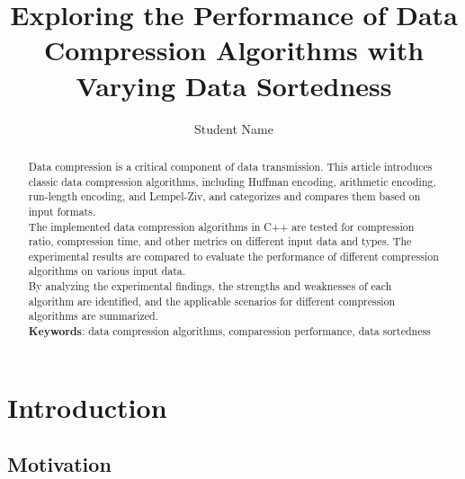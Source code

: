 \documentclass[sigconf]{acmart}
\begin{document}
\title{Exploring the Performance of Data Compression Algorithms with Varying
Data Sortedness}

\author{Student Name}

\begin{abstract}
    
    Data compression is a critical component of data transmission. This article introduces classic data compression algorithms, including Huffman encoding, arithmetic encoding, run-length encoding, and Lempel-Ziv, and categorizes and compares them based on input formats. \\
    The implemented data compression algorithms in C++ are tested for compression ratio, compression time, and other metrics on different input data and types. The experimental results are compared to evaluate the performance of different compression algorithms on various input data. \\
    By analyzing the experimental findings, the strengths and weaknesses of each algorithm are identified, and the applicable scenarios for different compression algorithms are summarized.\\

    \textbf{Keywords}: data compression algorithms, comparession performance, data sortedness

\end{abstract}


\maketitle

\section{Introduction}

\subsection{Motivation}
\end{document}
